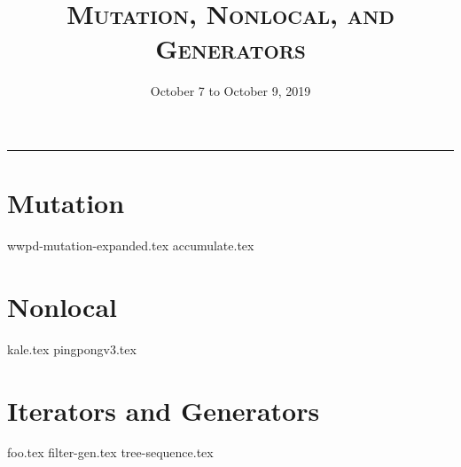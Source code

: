 \documentclass{exam}
\title{\textsc{Mutation, Nonlocal, and Generators}}
\date{October 7 to October 9, 2019}
\begin{document}
\maketitle
\rule{\textwidth}{0.15em}
\fontsize{12}{15}\selectfont

\section{Mutation}
\begin{questions}
{wwpd-mutation-expanded.tex}
\newpage
\newpage
{accumulate.tex}
\end{questions}

\newpage
\section{Nonlocal}
\begin{questions}
{kale.tex}
{pingpongv3.tex}
\end{questions}

\section{Iterators and Generators}
\begin{questions}
{foo.tex}
{filter-gen.tex}
{tree-sequence.tex}
\end{questions}
\end{document}
